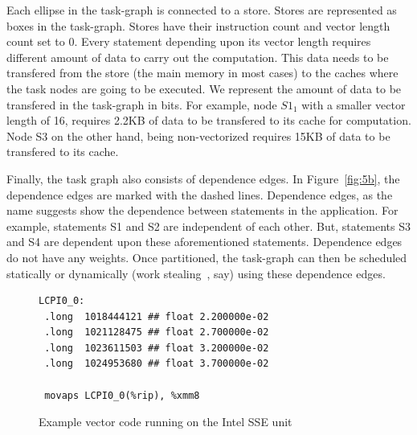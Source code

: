 Each ellipse in the task-graph is connected to a store. Stores are
represented as boxes in the task-graph. Stores have their instruction
count and vector length count set to 0. Every statement depending upon
its vector length requires different amount of data to carry out the
computation. This data needs to be transfered from the store (the main
memory in most cases) to the caches where the task nodes are going to be
executed. We represent the amount of data to be transfered in the
task-graph in bits. For example, node $S1_1$ with a smaller vector
length of 16, requires 2.2KB of data to be transfered to its cache for
computation. Node S3 on the other hand, being non-vectorized requires
15KB of data to be transfered to its cache.

Finally, the task graph also consists of dependence edges. In
Figure~\ref{fig:5b}, the dependence edges are marked with the dashed
lines. Dependence edges, as the name suggests show the dependence
between statements in the application. For example, statements S1 and S2
are independent of each other. But, statements S3 and S4 are dependent
upon these aforementioned statements. Dependence edges do not have any
weights. Once partitioned, the task-graph can then be scheduled
statically or dynamically (work stealing~\cite{rblu99}, say) using these
dependence edges.

\begin{figure}[h!]
  \centering
\begin{verbatim}
LCPI0_0:
 .long	1018444121 ## float 2.200000e-02
 .long	1021128475 ## float 2.700000e-02
 .long	1023611503 ## float 3.200000e-02
 .long	1024953680 ## float 3.700000e-02

 movaps	LCPI0_0(%rip), %xmm8
\end{verbatim}
  \caption{Example vector code running on the Intel SSE unit}
  \label{fig:6}
\end{figure}




